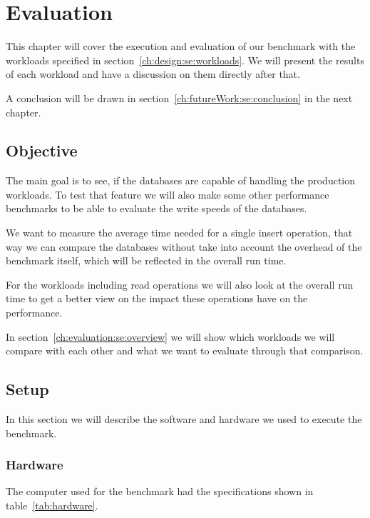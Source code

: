 \chapter{Evaluation}
\label{ch:evaluation}
This chapter will cover the execution and evaluation of our benchmark with the workloads specified in section~\ref{ch:design:se:workloads}.
We will present the results of each workload and have a discussion on them directly after that.

A conclusion will be drawn in section~\ref{ch:futureWork:se:conclusion} in the next chapter.

\section{Objective}
The main goal is to see,
if the databases are capable of handling the production workloads.
To test that feature we will also make some other performance benchmarks to be able to evaluate the write speeds of the databases.

We want to measure the average time needed for a single insert operation,
that way we can compare the databases without take into account the overhead of the benchmark itself,
which will be reflected in the overall run time.

For the workloads including read operations we will also look at the overall run time to get a better view on the impact these operations have on the performance.

In section~\ref{ch:evaluation:se:overview} we will show which workloads we will compare with each other and what we want to evaluate through that comparison.

\section{Setup}
In this section we will describe the software and hardware we used to execute the benchmark.

\subsection{Hardware}
The computer used for the benchmark had the specifications shown in table~\ref{tab:hardware}.

